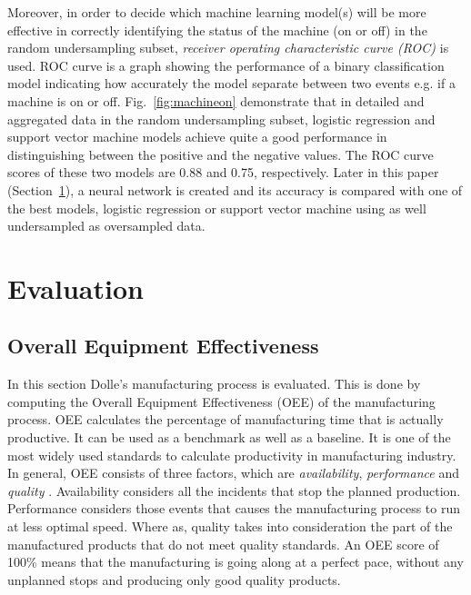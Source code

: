 \documentclass[runningheads]{llncs}
\begin{document}
Moreover, in order to decide which machine learning model(s) will be more effective in correctly identifying the status of the machine (on or off) in the random undersampling subset, \emph{receiver operating characteristic curve (ROC)} \cite{book} is used. ROC curve is a graph showing the performance of a binary classification model indicating how accurately the model separate between two events e.g. if a machine is on or off. Fig.~\ref{fig:machineon} demonstrate that in detailed and aggregated data in the random undersampling subset, logistic regression and support vector machine models achieve quite a good performance in distinguishing between the positive and the negative values. The ROC curve scores of these two models are 0.88 and 0.75, respectively. Later in this paper (Section~\ref{sec:evaluation}), a neural network is created and its accuracy is compared with one of the best models, logistic regression or support vector machine using as well undersampled as oversampled data.



\section {Evaluation}
\label{sec:evaluation}
\subsection{Overall Equipment Effectiveness}
In this section Dolle's manufacturing process is evaluated. This is done by computing the Overall Equipment Effectiveness (OEE) of the manufacturing process. OEE calculates the percentage of manufacturing time that is actually productive. It can be used as a benchmark as well as a baseline. It is one of the most widely used standards to calculate productivity in manufacturing industry. In general, OEE consists of three factors, which are \emph{availability}, \emph{performance} and \emph{quality} \cite{oee}. Availability considers all the incidents that stop the planned production. Performance considers those events that causes the manufacturing process to run at less optimal speed. Where as, quality takes into consideration the part of the manufactured products that do not meet quality standards. An OEE score of 100\% means that the manufacturing is going along at a perfect pace, without any unplanned stops and producing only good quality products. 
\end{document}
